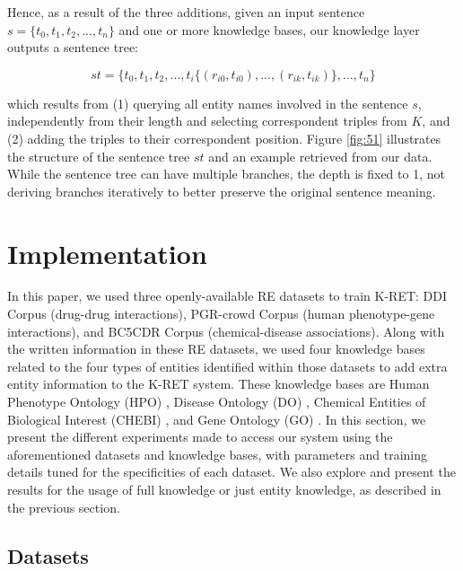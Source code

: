 Hence, as a result of the three additions, given an input sentence $s = \{t_{0}, t_{1}, t_{2}, ..., t_{n}\}$ and one or more knowledge bases, our knowledge layer outputs a sentence tree:

\begin{equation}
st = \{t_{0}, t_{1}, t_{2}, ..., t_{i}\{(r_{i0}, t_{i0}), ..., (r_{ik}, t_{ik})\}, ..., t_{n}\}\label{eq:03}
\end{equation}

which results from (1) querying all entity names involved in the sentence $s$, independently from their length and selecting correspondent triples from $K$, and (2) adding the triples to their correspondent position. Figure \ref{fig:51} illustrates the structure of the sentence tree $st$ and an example retrieved from our data. While the sentence tree can have multiple branches, the depth is fixed to 1, not deriving branches iteratively to better preserve the original sentence meaning. 


\section{Implementation}

In this paper, we used three openly-available RE datasets to train K-RET: DDI Corpus \citep{herrero2013ddi,segura2014lessons} (drug-drug interactions), PGR-crowd Corpus \citep{sousa2019silver,sousa2020hybrid} (human phenotype-gene interactions), and BC5CDR Corpus \citep{li2016biocreative} (chemical-disease associations). Along with the written information in these RE datasets, we used four knowledge bases related to the four types of entities identified within those datasets to add extra entity information to the K-RET system. These knowledge bases are Human Phenotype Ontology (HPO) \citep{kohler2021human}, Disease Ontology (DO) \citep{schriml2022human}, Chemical Entities of Biological Interest (CHEBI) \citep{degtyarenko2007chebi}, and Gene Ontology (GO) \citep{ashburner2000gene,gene2019gene}. In this section, we present the different experiments made to access our system using the aforementioned datasets and knowledge bases, with parameters and training details tuned for the specificities of each dataset. We also explore and present the results for the usage of full knowledge or just entity knowledge, as described in the previous section. 


\subsection{Datasets}

